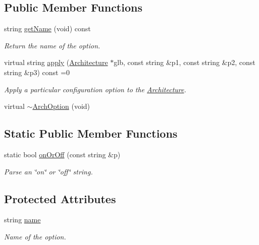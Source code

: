 \subsection*{Public Member Functions}
\begin{DoxyCompactItemize}
\item 
string \mbox{\hyperlink{class_arch_option_aac5f2ac365d3eaca6e68403183c7c8ac}{get\+Name}} (void) const
\begin{DoxyCompactList}\small\item\em Return the name of the option. \end{DoxyCompactList}\item 
virtual string \mbox{\hyperlink{class_arch_option_a5dc1b3adaee0d11e6018b85640272498}{apply}} (\mbox{\hyperlink{class_architecture}{Architecture}} $\ast$glb, const string \&p1, const string \&p2, const string \&p3) const =0
\begin{DoxyCompactList}\small\item\em Apply a particular configuration option to the \mbox{\hyperlink{class_architecture}{Architecture}}. \end{DoxyCompactList}\item 
virtual \mbox{\hyperlink{class_arch_option_a84af1d20a7ea91a1f10fc4dd05977165}{$\sim$\+Arch\+Option}} (void)
\end{DoxyCompactItemize}
\subsection*{Static Public Member Functions}
\begin{DoxyCompactItemize}
\item 
static bool \mbox{\hyperlink{class_arch_option_a20449a316e535886478bb1b73ac5ee68}{on\+Or\+Off}} (const string \&p)
\begin{DoxyCompactList}\small\item\em Parse an \char`\"{}on\char`\"{} or \char`\"{}off\char`\"{} string. \end{DoxyCompactList}\end{DoxyCompactItemize}
\subsection*{Protected Attributes}
\begin{DoxyCompactItemize}
\item 
string \mbox{\hyperlink{class_arch_option_a4c9a1914e575636d12be5c3ecc4aede3}{name}}
\begin{DoxyCompactList}\small\item\em Name of the option. \end{DoxyCompactList}\end{DoxyCompactItemize}


